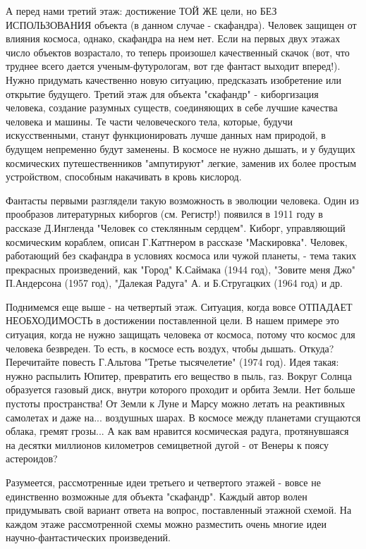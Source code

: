 \documentclass[11pt,a4paper]{article}
\begin{document}
А перед нами третий этаж: достижение ТОЙ ЖЕ цели, но БЕЗ ИСПОЛЬЗОВАНИЯ объекта (в данном случае - скафандра). Человек защищен от влияния космоса, однако, скафандра на нем нет. Если на первых двух этажах число объектов возрастало, то теперь произошел качественный скачок (вот, что труднее всего дается ученым-футурологам, вот где фантаст выходит вперед!). Нужно придумать качественно новую ситуацию, предсказать изобретение или открытие будущего. Третий этаж для объекта "скафандр" - киборгизация человека, создание разумных существ, соединяющих в себе лучшие качества человека и машины. Те части человеческого тела, которые, будучи искусственными, станут функционировать лучше данных нам природой, в будущем непременно будут заменены. В космосе не нужно дышать, и у будущих космических путешественников "ампутируют" легкие, заменив их более простым устройством, способным накачивать в кровь кислород.

Фантасты первыми разглядели такую возможность в эволюции человека. Один из прообразов литературных киборгов (см. Регистр!) появился в 1911 году в рассказе Д.Ингленда "Человек со стеклянным сердцем". Киборг, управляющий космическим кораблем, описан Г.Каттнером в рассказе "Маскировка". Человек, работающий без скафандра в условиях космоса или чужой планеты, - тема таких прекрасных произведений, как "Город" К.Саймака (1944 год), "Зовите меня Джо" П.Андерсона (1957 год), "Далекая Радуга" А. и Б.Стругацких (1964 год) и др.

Поднимемся еще выше - на четвертый этаж. Ситуация, когда вовсе ОТПАДАЕТ НЕОБХОДИМОСТЬ в достижении поставленной цели. В нашем примере это ситуация, когда не нужно защищать человека от космоса, потому что космос для человека безвреден. То есть, в космосе есть воздух, чтобы дышать. Откуда? Перечитайте повесть Г.Альтова "Третье тысячелетие" (1974 год). Идея такая: нужно распылить Юпитер, превратить его вещество в пыль, газ. Вокруг Солнца образуется газовый диск, внутри которого проходит и орбита Земли. Нет больше пустоты пространства! От Земли к Луне и Марсу можно летать на реактивных самолетах и даже на... воздушных шарах. В космосе между планетами сгущаются облака, гремят грозы... А как вам нравится космическая радуга, протянувшаяся на десятки миллионов километров семицветной дугой - от Венеры к поясу астероидов?

Разумеется, рассмотренные идеи третьего и четвертого этажей - вовсе не единственно возможные для объекта "скафандр". Каждый автор волен придумывать свой вариант ответа на вопрос, поставленный этажной схемой. На каждом этаже рассмотренной схемы можно разместить очень многие идеи научно-фантастических произведений.
\end{document}

